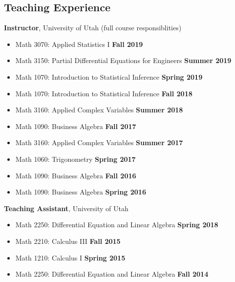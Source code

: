 \documentclass[margin,line]{res}
\begin{document}
\begin{resume}
\section{\sc Teaching Experience}
{\bf Instructor}, University of Utah (full course responsiblities)
\vspace*{.05in}
\begin{itemize}
\item[ ] Math 3070: Applied Statistics I \hfill {\bf Fall 2019}
\item[ ] Math 3150: Partial Differential Equations for Engineers \hfill {\bf Summer 2019}
\item[ ] Math 1070: Introduction to Statistical Inference \hfill {\bf Spring 2019}
\item[ ] Math 1070: Introduction to Statistical Inference \hfill {\bf Fall 2018}
\item[ ] Math 3160: Applied Complex Variables \hfill {\bf Summer 2018}
\item[ ] Math 1090: Business Algebra \hfill {\bf Fall 2017}
\item[ ] Math 3160: Applied Complex Variables \hfill {\bf Summer 2017}
\item[ ] Math 1060: Trigonometry \hfill {\bf Spring 2017}
\item[ ] Math 1090: Business Algebra \hfill {\bf Fall 2016}
\item[ ] Math 1090: Business Algebra \hfill {\bf Spring 2016}
\end{itemize}
\iffalse
{\bf Substitute Teaching Lectures}, University of Utah
\vspace*{.05in}
\begin{itemize}
\item[ ] Math 5080: Statistical Inference I, one lecture \hfill {\bf Fall 2019}
\item[ ] Math 3140: Vector Calculus and PDEs, one lecture \hfill {\bf Summer 2019}
\item[ ] Math 2210: Calculus III, two lectures \hfill {\bf Spring 2018}
\item[ ] Math 5750/6880: Mathematics and Climate, one lecture \hfill {\bf Fall 2017}
\item[ ] Math 1060: Trigonometry, one lecture \hfill {\bf Spring 2017}
\item[ ] Math 2210: Calculus III, one lecture \hfill {\bf Fall 2015}
\end{itemize}
\fi
{\bf Teaching Assistant}, University of Utah
\vspace*{.05in}
\begin{itemize}
\item[ ] Math 2250: Differential Equation and Linear Algebra \hfill {\bf Spring 2018}
\item[ ] Math 2210: Calculus III \hfill {\bf Fall 2015}
\item[ ] Math 1210: Calculus I \hfill {\bf Spring 2015}
\item[ ] Math 2250: Differential Equation and Linear Algebra \hfill {\bf Fall 2014}
\end{itemize}

\end{resume}
\end{document}
